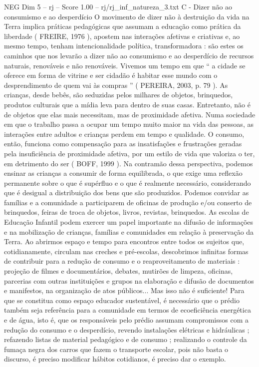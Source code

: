 \begin{textsample}{NEG Dim 5 – rj – Score 1.00 – rj/rj\_inf\_natureza\_3.txt}  \label{ex:f5_neg_097}
C - Dizer não ao consumismo e ao desperdício O movimento de dizer não à destruição da vida na Terra implica práticas pedagógicas que assumam a educação como prática da liberdade ( FREIRE, 1976 ), apostem nas interações afetivas e criativas e, ao mesmo tempo, tenham intencionalidade política, transformadora : são estes os caminhos que nos levarão a dizer não ao consumismo e ao desperdício de recursos naturais, renováveis e não renováveis.
Vivemos um tempo em que “ a cidade se oferece em forma de vitrine e ser cidadão é habitar esse mundo com o desprendimento de quem vai às compras ” ( PEREIRA, 2003, p. 79 ).
As crianças, desde bebês, são seduzidas pelos milhares de objetos, brinquedos, produtos culturais que a mídia leva para dentro de suas casas.
Entretanto, não é de objetos que elas mais necessitam, mas de proximidade afetiva.
Numa sociedade em que o trabalho passa a ocupar um tempo muito maior na vida das pessoas, as interações entre adultos e crianças perdem em tempo e qualidade.
O consumo, então, funciona como compensação para as insatisfações e frustrações geradas pela insuficiência de proximidade afetiva, por um estilo de vida que valoriza o ter, em detrimento do ser ( BOFF, 1999 ).
Na contramão dessa perspectiva, podemos ensinar as crianças a consumir de forma equilibrada, o que exige uma reflexão permanente sobre o que é supérfluo e o que é realmente necessário, considerando que é desigual a distribuição dos bens que são produzidos.
Podemos convidar as famílias e a comunidade a participarem de oficinas de produção e/ou conserto de brinquedos, feiras de troca de objetos, livros, revistas, brinquedos.
As escolas de Educação Infantil podem exercer um papel importante na difusão de informações e na mobilização de crianças, famílias e comunidades em relação à preservação da Terra.
Ao abrirmos espaço e tempo para encontros entre todos os sujeitos que, cotidianamente, circulam nas creches e pré-escolas, descobrimos infinitas formas de contribuir para a redução de consumo e o reaproveitamento de materiais : projeção de filmes e documentários, debates, mutirões de limpeza, oficinas, parcerias com outras instituições e grupos na elaboração e difusão de documentos e manifestos, na organização de atos públicos...
Mas isso não é suficiente!
Para que se constitua como espaço educador sustentável, é necessário que o prédio também seja referência para a comunidade em termos de ecoeficiência energética e de água, isto é, que os responsáveis pelo prédio assumam compromissos com a redução do consumo e o desperdício, revendo instalações elétricas e hidráulicas ; refazendo listas de material pedagógico e de consumo ; realizando o controle da fumaça negra dos carros que fazem o transporte escolar, pois não basta o discurso, é preciso modificar hábitos cotidianos, é preciso dar o exemplo.

\end{textsample}
